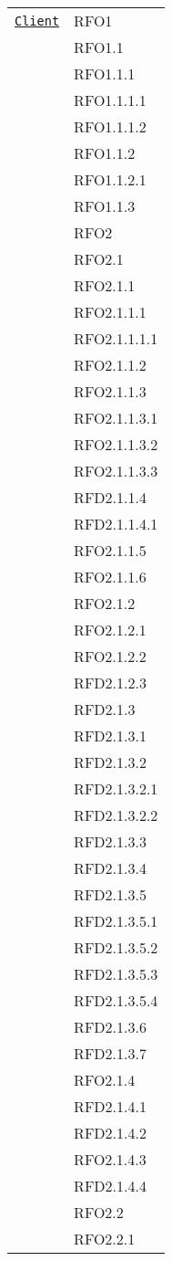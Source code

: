 \begin{longtable}{|>{\centering}m{10cm}|m{3cm}<{\centering}|}
\hyperref[Client]{\texttt{Client}} & RFO1\\
& RFO1.1\\
& RFO1.1.1\\
& RFO1.1.1.1\\
& RFO1.1.1.2\\
& RFO1.1.2\\
& RFO1.1.2.1\\
& RFO1.1.3\\
& RFO2\\
& RFO2.1\\
& RFO2.1.1\\
& RFO2.1.1.1\\
& RFO2.1.1.1.1\\
& RFO2.1.1.2\\
& RFO2.1.1.3\\
& RFO2.1.1.3.1\\
& RFO2.1.1.3.2\\
& RFO2.1.1.3.3\\
& RFD2.1.1.4\\
& RFD2.1.1.4.1\\
& RFO2.1.1.5\\
& RFO2.1.1.6\\
& RFO2.1.2\\
& RFO2.1.2.1\\
& RFO2.1.2.2\\
& RFD2.1.2.3\\
& RFD2.1.3\\
& RFD2.1.3.1\\
& RFD2.1.3.2\\
& RFD2.1.3.2.1\\
& RFD2.1.3.2.2\\
& RFD2.1.3.3\\
& RFD2.1.3.4\\
& RFD2.1.3.5\\
& RFD2.1.3.5.1\\
& RFD2.1.3.5.2\\
& RFD2.1.3.5.3\\
& RFD2.1.3.5.4\\
& RFD2.1.3.6\\
& RFD2.1.3.7\\
& RFO2.1.4\\
& RFD2.1.4.1\\
& RFD2.1.4.2\\
& RFO2.1.4.3\\
& RFD2.1.4.4\\
& RFO2.2\\
& RFO2.2.1\\

\end{longtable}

